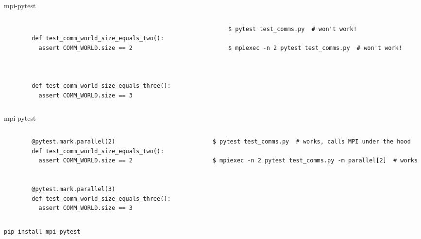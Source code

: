 \documentclass[aspectratio=169]{beamer}
\begin{document}
\begin{frame}[t,fragile]{mpi-pytest}
  \vspace{3em}

  \begin{columns}
    \begin{column}{.4\textwidth}
      \begin{verbatim}

        def test_comm_world_size_equals_two():
          assert COMM_WORLD.size == 2



        def test_comm_world_size_equals_three():
          assert COMM_WORLD.size == 3
      \end{verbatim}
    \end{column}
    \begin{column}{.6\textwidth}
      \begin{verbatim}
        $ pytest test_comms.py  # won't work!

        $ mpiexec -n 2 pytest test_comms.py  # won't work!
      \end{verbatim}
    \end{column}
  \end{columns}
\end{frame}

\begin{frame}[t,fragile]{mpi-pytest}
  \vspace{3em}

  \begin{columns}
    \begin{column}{.4\textwidth}
      \begin{verbatim}
        @pytest.mark.parallel(2)
        def test_comm_world_size_equals_two():
          assert COMM_WORLD.size == 2


        @pytest.mark.parallel(3)
        def test_comm_world_size_equals_three():
          assert COMM_WORLD.size == 3
      \end{verbatim}
    \end{column}
    \begin{column}{.6\textwidth}
      \begin{verbatim}
        $ pytest test_comms.py  # works, calls MPI under the hood

        $ mpiexec -n 2 pytest test_comms.py -m parallel[2]  # works
      \end{verbatim}
    \end{column}
  \end{columns}

  \vspace{2em}

  \pause

  \begin{center}
    \footnotesize{\texttt{pip install mpi-pytest}}
  \end{center}
\end{frame}
\end{document}

